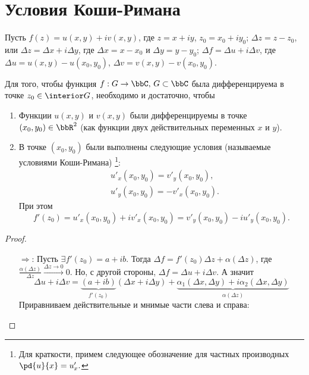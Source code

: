 \section{Условия Коши-Римана}  
Пусть $f(z)=u(x,y)+iv(x,y)$, где $z=x+iy$, $z_0=x_0+iy_0$; $\Delta z=z-z_0$, или $\Delta z = \Delta x + i\Delta y$, где $\Delta x = x-x_0$ и $\Delta y =y-y_0$; $\Delta f = \Delta u + i\Delta v$, где $\Delta u = u(x,y)-u(x_0,y_0)$,  $\Delta v = v(x,y)-v(x_0,y_0)$. 
\begin{leftbar}
\begin{thm} 
Для того, чтобы функция $f: G  \to \bbC,\, G \subset \bbC$ была дифференцируема в точке $z_0\in \interior G$, необходимо и достаточно, чтобы
\begin{enumerate}
\item
Функции $u(x,y)$ и $v(x,y)$ были дифференцируемы в точке $(x_0,y_0) \in \bbR^2$ (как функции двух действительных переменных $x$ и $y$).
\item
В точке  $(x_0,y_0)$ были выполнены следующие условия (называемые условиями Коши-Римана) \footnote{Для краткости, примем следующее обозначение для частных производных $\pd{\textstyle u}{ \textstyle x}=u'_x.$}:
\begin{equation}
\label{exp17}
\begin{split}
&u'_x(x_0,y_0) = v'_y(x_0,y_0), \\ &u'_y(x_0,y_0) = -v'_x(x_0,y_0).
\end{split}
\end{equation}
При этом
\begin{equation}
\label{exp8}
f'(z_0) = u'_x(x_0,y_0) + iv'_x(x_0,y_0)= v'_y(x_0,y_0) -iu'_y(x_0,y_0).
\end{equation}
\end{enumerate}
\end{thm}
\begin{proof}
$ $\linebreak
\vspace*{-\baselineskip}
\begin{itemize}
\item[$\Longrightarrow$:]
Пусть $\exists f'(z_0) = a+ib $. Тогда $\Delta f = f'(z_0)\Delta z + \alpha(\Delta z)$, где $\frac{\alpha(\Delta z)}{\Delta z}\xrightarrow{\Delta z \to 0}0$. Но, с другой стороны, $\Delta f = \Delta u + i \Delta v$. А значит
$$
\Delta u + i \Delta v = \underbrace{(a+ib)}_{f'(z_0)}(\Delta x + i \Delta y) + \underbrace{\alpha_1(\Delta x, \Delta y) +i \alpha_2(\Delta x, \Delta y)}_{\alpha(\Delta z)}
$$
Приравниваем действительные и мнимые части слева и справа:

\end{itemize}
\end{proof}
\end{leftbar}
